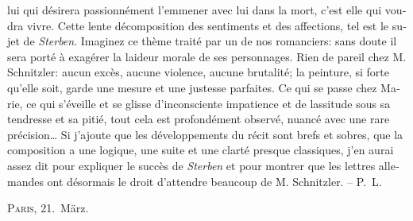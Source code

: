 {{\begin{otherlanguage}{french}
                     lui qui désirera passionnément l’emmener avec lui dans la mort, c’est elle qui
                     voudra vivre. Cette lente décomposition des sentiments et des affections, tel
                     est le sujet de \emph{Sterben}. Imaginez ce thème traité par un de nos romanciers: sans doute il sera
                     porté à exagérer la laideur morale de ses personnages. Rien de pareil chez M.
                     Schnitzler: aucun excès, aucune violence, aucune brutalité; la peinture, si
                     forte qu’elle soit, garde une mesure et une justesse parfaites. Ce qui se passe
                     chez Marie, ce qui
                     s’éveille et se glisse d’inconsciente impatience et de lassitude sous sa
                     tendresse et sa pitié, tout cela est profondément observé, nuancé avec une rare
                        précision{\dots} Si j’ajoute que les développements du
                        récit sont brefs et
                     sobres, que la composition a une logique, une suite et une clarté presque
                     classiques, j’en aurai assez dit pour expliquer le succès de \emph{Sterben} et pour montrer que les lettres allemandes ont désormais le droit
                     d’attendre beaucoup de M. Schnitzler. – P. L.\end{otherlanguage}}}\pend
           \vspace{1em}
\pstart
           \raggedleft{}{\pb}\textsc{Paris}, 21. März.\pend
           
